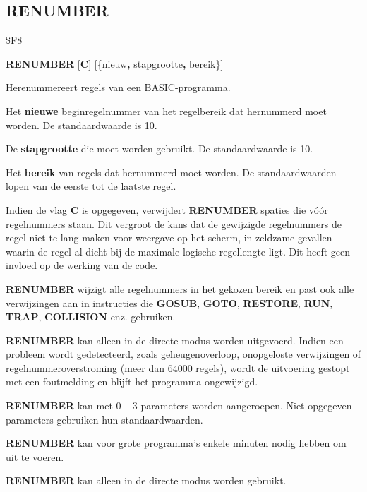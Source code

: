 \subsection{RENUMBER}
\begin{description}[leftmargin=2cm,style=nextline]
\item [Token:]    \$F8

\item [Formaat:]   {\bf RENUMBER} [{\bf C}] [\{nieuw{\bf,} stapgrootte{\bf,} bereik\}]

\item [Gebruik:]    Herenummereert regels van een BASIC-programma.

                  Het {\bf nieuwe} beginregelnummer van het regelbereik dat hernummerd moet worden. De standaardwaarde is 10.

De {\bf stapgrootte} die moet worden gebruikt. De standaardwaarde is 10.

                  Het {\bf bereik} van regels dat hernummerd moet worden. De standaardwaarden lopen van de eerste tot de laatste regel.

                  Indien de vlag {\bf C} is opgegeven, verwijdert {\bf RENUMBER} spaties die vóór regelnummers staan. Dit vergroot de kans dat de gewijzigde regelnummers de regel niet te lang maken voor weergave op het scherm, in zeldzame gevallen waarin de regel al dicht bij de maximale logische regellengte ligt. Dit heeft geen invloed op de werking van de code.

                  {\bf RENUMBER} wijzigt alle regelnummers in het gekozen bereik en past ook alle verwijzingen aan in instructies die {\bf GOSUB}, {\bf GOTO}, {\bf RESTORE}, {\bf RUN}, {\bf TRAP}, {\bf COLLISION} enz. gebruiken.

                  {\bf RENUMBER} kan alleen in de directe modus worden uitgevoerd. Indien een probleem wordt gedetecteerd, zoals geheugenoverloop, onopgeloste verwijzingen of regelnummeroverstroming (meer dan 64000 regels), wordt de uitvoering gestopt met een foutmelding en blijft het programma ongewijzigd.

                  {\bf RENUMBER} kan met 0 -- 3 parameters worden aangeroepen. Niet-opgegeven parameters gebruiken hun standaardwaarden.

\item [Opmerkingen:]  {\bf RENUMBER} kan voor grote programma's enkele minuten nodig hebben om uit te voeren.

                  {\bf RENUMBER} kan alleen in de directe modus worden gebruikt.


\end{description}
